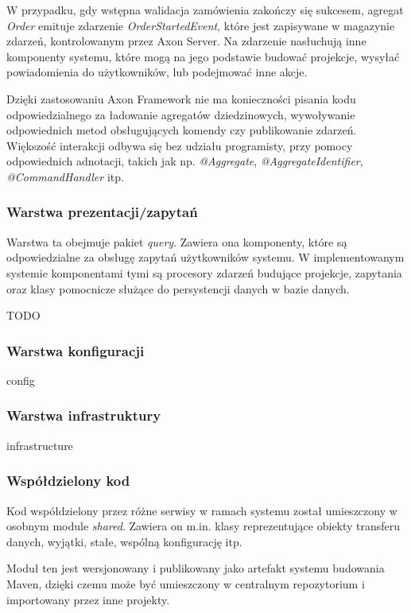 W przypadku, gdy wstępna walidacja zamówienia zakończy się sukcesem, agregat \textit{Order} emituje zdarzenie \textit{OrderStartedEvent}, które jest zapisywane w magazynie zdarzeń, kontrolowanym przez Axon Server. Na zdarzenie nasłuchują inne komponenty systemu, które mogą na jego podstawie budować projekcje, wysyłać powiadomienia do użytkowników, lub podejmować inne akcje.

Dzięki zastosowaniu Axon Framework nie ma konieczności pisania kodu odpowiedzialnego za ładowanie agregatów dziedzinowych, wywoływanie odpowiednich metod obsługujących komendy czy publikowanie zdarzeń. Większość interakcji odbywa się bez udziału programisty, przy pomocy odpowiednich adnotacji, takich jak np. \textit{@Aggregate}, \textit{@AggregateIdentifier}, \textit{@CommandHandler} itp.

\subsubsection{Warstwa prezentacji/zapytań}

Warstwa ta obejmuje pakiet \textit{query}. Zawiera ona komponenty, które są odpowiedzialne za obsługę zapytań użytkowników systemu. W implementowanym systemie komponentami tymi są procesory zdarzeń budujące projekcje, zapytania oraz klasy pomocnicze służące do persystencji danych w bazie danych.

TODO

\subsubsection{Warstwa konfiguracji} config

\subsubsection{Warstwa infrastruktury} infrastructure

\subsubsection{Współdzielony kod}

Kod współdzielony przez różne serwisy w ramach systemu został umieszczony w osobnym module \textit{shared}. Zawiera on m.in. klasy reprezentujące obiekty transferu danych, wyjątki, stałe, wspólną konfigurację itp.

Moduł ten jest wersjonowany i publikowany jako artefakt systemu budowania Maven, dzięki czemu może być umieszczony w centralnym repozytorium i importowany przez inne projekty.

